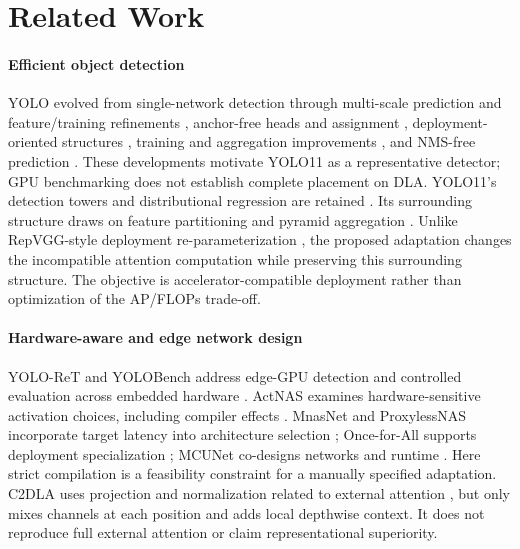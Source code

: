 \section{Related Work}
\label{sec:related}
\paragraph*{Efficient object detection}

YOLO evolved from single-network detection \cite{redmon2016yolo} through
multi-scale prediction and feature/training refinements
\cite{redmon2018yolov3,bochkovskiy2020yolov4}, anchor-free heads and assignment
\cite{ge2021yolox}, deployment-oriented structures \cite{li2022yolov6},
training and aggregation improvements \cite{wang2023yolov7,wang2024yolov9},
and NMS-free prediction \cite{wang2024yolov10}. These developments motivate
YOLO11 as a representative detector; GPU benchmarking does not establish
complete placement on DLA. YOLO11's detection towers and distributional
regression are retained \cite{jocher2024yolo11,li2020gfl}. Its surrounding
structure draws on feature partitioning and pyramid aggregation
\cite{wang2020cspnet,lin2017fpn,liu2018panet}. Unlike RepVGG-style deployment
re-parameterization \cite{ding2021repvgg,li2022yolov6}, the proposed adaptation changes
the incompatible attention computation while preserving this surrounding
structure. The objective is accelerator-compatible deployment rather than
optimization of the AP/FLOPs trade-off.

\paragraph*{Hardware-aware and edge network design}

YOLO-ReT and YOLOBench address edge-GPU detection and controlled evaluation
across embedded hardware \cite{ganesh2022yoloret,lazarevich2023yolobench}.
ActNAS examines hardware-sensitive activation choices, including compiler
effects \cite{sah2025actnas}. MnasNet and ProxylessNAS incorporate target
latency into architecture selection \cite{tan2019mnasnet,cai2019proxyless};
Once-for-All supports deployment specialization \cite{cai2020ofa}; MCUNet
co-designs networks and runtime \cite{lin2020mcunet}. Here strict compilation
is a feasibility constraint for a manually specified adaptation. C2DLA uses
projection and normalization related to external attention
\cite{guo2023external}, but only mixes channels at each position and adds
local depthwise context. It does not reproduce full external attention or
claim representational superiority.

